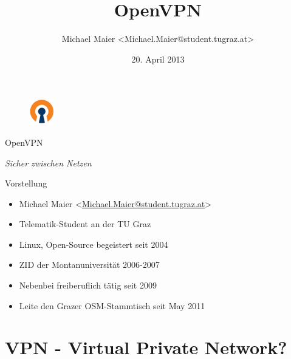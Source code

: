 \documentclass{beamer}
\title{OpenVPN}
\author{Michael Maier \textless Michael.Maier@student.tugraz.at\textgreater}
\date{20. April 2013}
\begin{document}

\begin{frame} 


\begin{figure}
  \centering
  \includegraphics[width=.1\textwidth]{openvpn.png}
\end{figure}

\begin{center}
\Huge{OpenVPN\\}
\end{center}

\begin{center}
\Large{\emph{Sicher zwischen Netzen}}
\end{center}

\end{frame}



\begin{frame}{Vorstellung}

  \begin{itemize}
    \item Michael Maier \textless \href{mailto:Michael.Maier@student.tugraz.at}{Michael.Maier@student.tugraz.at}\textgreater
    \item Telematik-Student an der TU Graz 
    \item Linux, Open-Source begeistert seit 2004
    \item ZID der Montanuniversität 2006-2007
    \item Nebenbei freiberuflich tätig seit 2009
	    \pause
    \item Leite den Grazer OSM-Stammtisch seit May 2011
  \end{itemize}
\end{frame}

\section{VPN - Virtual Private Network?}
\end{document}
